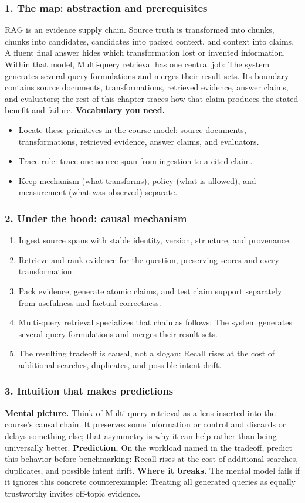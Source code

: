 \subsubsection*{1. The map: abstraction and prerequisites}
RAG is an evidence supply chain. Source truth is transformed into chunks, chunks into candidates, candidates into packed context, and context into claims. A fluent final answer hides which transformation lost or invented information.
Within that model, Multi-query retrieval has one central job: The system generates several query formulations and merges their result sets. Its boundary contains source documents, transformations, retrieved evidence, answer claims, and evaluators; the rest of this chapter traces how that claim produces the stated benefit and failure.
\textbf{Vocabulary you need.}\begin{itemize}
\item Locate these primitives in the course model: source documents, transformations, retrieved evidence, answer claims, and evaluators.
\item Trace rule: trace one source span from ingestion to a cited claim.
\item Keep mechanism (what transforms), policy (what is allowed), and measurement (what was observed) separate.
\end{itemize}
\subsubsection*{2. Under the hood: causal mechanism}\begin{enumerate}
\item Ingest source spans with stable identity, version, structure, and provenance.
\item Retrieve and rank evidence for the question, preserving scores and every transformation.
\item Pack evidence, generate atomic claims, and test claim support separately from usefulness and factual correctness.
\item Multi-query retrieval specializes that chain as follows: The system generates several query formulations and merges their result sets.
\item The resulting tradeoff is causal, not a slogan: Recall rises at the cost of additional searches, duplicates, and possible intent drift.
\end{enumerate}
\subsubsection*{3. Intuition that makes predictions}
\textbf{Mental picture.} Think of Multi-query retrieval as a lens inserted into the course's causal chain. It preserves some information or control and discards or delays something else; that asymmetry is why it can help rather than being universally better.
\textbf{Prediction.} On the workload named in the tradeoff, predict this behavior before benchmarking: Recall rises at the cost of additional searches, duplicates, and possible intent drift.
\textbf{Where it breaks.} The mental model fails if it ignores this concrete counterexample: Treating all generated queries as equally trustworthy invites off-topic evidence.
